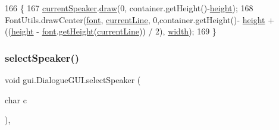 \begin{DoxyCode}
166                                                           \{
167         \mbox{\hyperlink{classgui_1_1_dialogue_g_u_i_a8115ee094decde84cada17b49ef77375}{currentSpeaker}}.\mbox{\hyperlink{classorg_1_1newdawn_1_1slick_1_1_image_a9bddcca05c7140ab45df8ac5b250b6cd}{draw}}(0, container.getHeight()-\mbox{\hyperlink{classgui_1_1_dialogue_g_u_i_a41a3d504adf0501b3c0b15ce1f046fa8}{height}});
168         FontUtils.drawCenter(\mbox{\hyperlink{classgui_1_1_dialogue_g_u_i_a045cc33fd00133f73a614eb061a07d2f}{font}}, \mbox{\hyperlink{classgui_1_1_dialogue_g_u_i_a44a2c9abf9ce5527b307a1828266d199}{currentLine}}, 0,container.getHeight()-
      \mbox{\hyperlink{classgui_1_1_dialogue_g_u_i_a41a3d504adf0501b3c0b15ce1f046fa8}{height}} + ((\mbox{\hyperlink{classgui_1_1_dialogue_g_u_i_a41a3d504adf0501b3c0b15ce1f046fa8}{height}} - \mbox{\hyperlink{classgui_1_1_dialogue_g_u_i_a045cc33fd00133f73a614eb061a07d2f}{font}}.\mbox{\hyperlink{classorg_1_1newdawn_1_1slick_1_1_unicode_font_a409f20ee363890da63571bbc46567808}{getHeight}}(\mbox{\hyperlink{classgui_1_1_dialogue_g_u_i_a44a2c9abf9ce5527b307a1828266d199}{currentLine}})) / 2),
      \mbox{\hyperlink{classgui_1_1_dialogue_g_u_i_a62770f57482703fba82e5e885b8f60cc}{width}});
169     \}
\end{DoxyCode}
\mbox{\label{classgui_1_1_dialogue_g_u_i_a69d754e37de68f81fdffadda6b4c8b63}} 
\subsubsection{\texorpdfstring{select\+Speaker()}{selectSpeaker()}}
{\footnotesize\ttfamily void gui.\+Dialogue\+G\+U\+I.\+select\+Speaker (\begin{DoxyParamCaption}\item[{char}]{c }\end{DoxyParamCaption})\hspace{0.3cm}{\ttfamily [inline]}, {\ttfamily [private]}}


